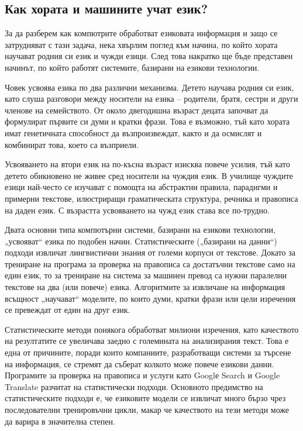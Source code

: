 \begin{multicols}{2}
  \subsection{Как хората и машините учат език?}

  За да разберем как компютрите обработват езиковата информация и защо се затрудняват с тази задача, нека хвърлим поглед към начина, по който хората научават родния си език и чужди езици. След това
   накратко ще бъде представен начинът, по който работят системите, базирани на езикови технологии.

  Човек усвоява езика по два различни механизма. Детето
   научава родния си език, като слуша разговори между
   носители на езика – родители, братя, сестри и други
   членове на семейството. От около двегодишна възраст децата започват да формулират първите си думи и кратки фрази. Това е възможно, тъй като хората имат генетичната способност да възпроизвеждат, както и да осмислят и комбинират това, което са възприели.

  Усвояването на втори език на по-късна възраст изисква
   повече усилия, тъй като детето обикновено не живее сред
   носители на чуждия език. В училище чуждите езици най-често се изучават с помощта на абстрактни правила, парадигми и примерни текстове, илюстриращи  граматическата структура, речника и правописа на даден език. С възрастта  усвояването на чужд език става все по-трудно.


  Двата основни типа компютърни системи, базирани на езикови технологии, „усвояват“ езика по подобен начин. Статистическите („базирани на данни“) подходи извличат
   лингвистични знания от големи корпуси от текстове. Докато  за трениране на програма за проверка на правописа са достатъчни текстове само на един език, то за трениране на система за машинен превод са нужни паралелни текстове на два (или повече) езика. Алгоритмите за извличане на информация всъщност „научават“ моделите, по които думи, кратки
   фрази или цели изречения се превеждат от един на друг език. 

  Статистическите методи понякога обработват милиони изречения, като качеството на резултатите се увеличава заедно с големината на анализирания
   текст. Това е една от причините, поради които компаниите, разработващи системи за търсене на информация, се стремят да съберат колкото
   може повече езикови данни. Програмите за проверка на
   правописа и услуги като Googlе Search и Google Translate разчитат на статистически подходи. Основното предимство на статистическите подходи е, че езиковите модели се извличат много бързо чрез последователни тренировъчни цикли, макар че качеството на тези методи може да варира в значителна степен.


\end{multicols}
